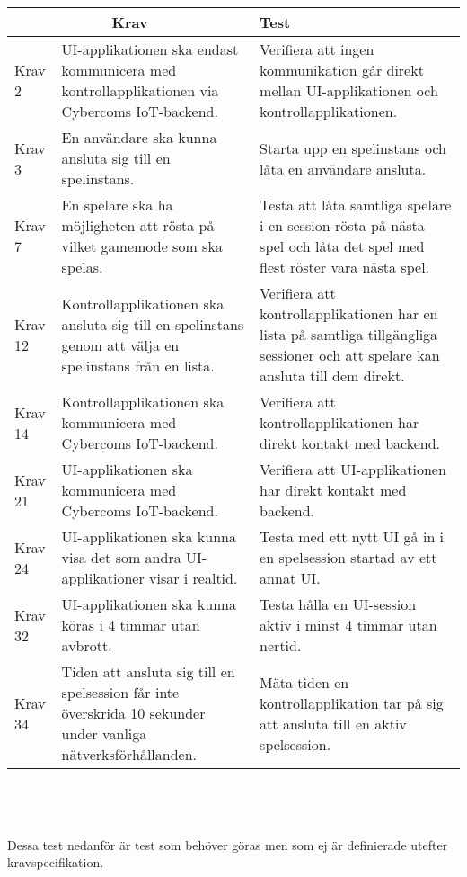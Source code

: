 	\begin{tabular}{| p{1.5cm} | p{6cm} | p{8cm}|}

  \hline
    \multicolumn{2}{|c|}{Krav}&{Test}\\
    \hline
		Krav 2&UI-applikationen ska endast kommunicera med kontrollapplikationen via Cybercoms IoT-backend.&Verifiera att ingen kommunikation går direkt mellan UI-applikationen och kontrollapplikationen.\\
		\hline
		Krav 3& En användare ska kunna ansluta sig till en spelinstans. &Starta upp en spelinstans och låta en användare ansluta. \\
		\hline
		Krav 7& En spelare ska ha möjligheten att rösta på vilket gamemode som ska spelas. & Testa att låta samtliga spelare i en session rösta på nästa spel och låta det spel med flest röster vara nästa spel.\\
		\hline
		Krav 12& Kontrollapplikationen ska ansluta sig till en spelinstans genom att välja en spelinstans från en lista. & Verifiera att kontrollapplikationen har en lista på samtliga tillgängliga sessioner och att spelare kan ansluta till dem direkt. \\
		\hline
		Krav 14& Kontrollapplikationen ska kommunicera med Cybercoms IoT-backend. & Verifiera att kontrollapplikationen har direkt kontakt med backend. \\
		\hline
		Krav 21& UI-applikationen ska kommunicera med Cybercoms IoT-backend. & Verifiera att UI-applikationen har direkt kontakt med backend. \\
		\hline
		Krav 24& UI-applikationen ska kunna visa det som andra UI-applikationer visar i realtid. & Testa med ett nytt UI gå in i en spelsession startad av ett annat UI. \\
		\hline
		Krav 32& UI-applikationen ska kunna köras i 4 timmar utan avbrott. & Testa hålla en UI-session aktiv i minst 4 timmar utan nertid. \\
		\hline
		Krav 34& Tiden att ansluta sig till en spelsession får inte överskrida 10 sekunder under vanliga nätverksförhållanden. & Mäta tiden en kontrollapplikation tar på sig att ansluta till en aktiv spelsession. \\
		\hline


  \end{tabular}
    \\  \\ \\
  Dessa test nedanför är test som behöver göras men som ej är definierade utefter kravspecifikation.
  \\

